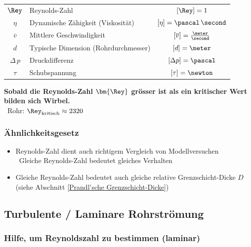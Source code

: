 \begin{tabular}{c l c}
    $\Rey$          & Reynolds-Zahl                         & $[\Rey] = 1$                              \\
    $\eta$          & Dynamische Zähigkeit (Viskosität)     & $[\eta] = \pascal \, \second$             \\
    $\overline{v}$  & Mittlere Geschwindigkeit              & $[\overline{v}] = \frac{\meter}{\second}$ \\
    $d$             & Typische Dimension (Rohrdurchmesser)  & $[d] = \meter$                            \\
    $\Delta \, p$   & Druckdifferenz                        & $[\Delta p] = \pascal$                    \\
    $\tau$          & Schubspannung                         & $[\tau] = \newton$
\end{tabular}

\medskip

\textbf{Sobald die Reynolds-Zahl $\bm{\Rey}$ grösser ist als ein kritischer Wert bilden sich Wirbel.} \\
\textrightarrow\ Rohr:  $\Rey_{\rm kritisch} \approx 2320$


\subsubsection{Ähnlichkeitsgesetz}

\begin{itemize}
    \item Reynolds-Zahl dient auch richtigem Vergleich von Modellversuchen \\
        \textrightarrow\ Gleiche Reynolds-Zahl bedeutet gleiches Verhalten
    \item  Gleiche Reynolds-Zahl bedeutet auch gleiche relative Grenzschicht-Dicke $D$ (siehe Abschnitt \ref{Prandl'sche Grenzschicht-Dicke})
\end{itemize}


\subsection{Turbulente / Laminare Rohrströmung}

\subsubsection{Hilfe, um Reynoldszahl zu bestimmen (laminar)}

\vspace{-0.2cm}

